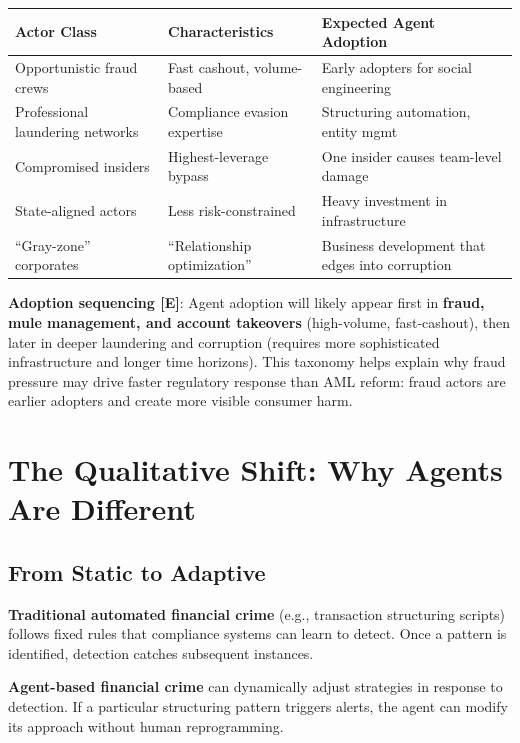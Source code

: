\documentclass[11pt,letterpaper]{article}
\begin{document}
\begingroup\small
\begin{longtable}{L{0.280\dimexpr{}\tabcolsep\relax}L{0.320\dimexpr{}\tabcolsep\relax}L{0.400\dimexpr{}\tabcolsep\relax}}
\toprule
\textbf{Actor Class} & \textbf{Characteristics} & \textbf{Expected Agent Adoption} \\
\midrule
\endhead
Opportunistic fraud crews & Fast cashout, volume-based & Early adopters for social engineering \\
Professional laundering networks & Compliance evasion expertise & Structuring automation, entity mgmt \\
Compromised insiders & Highest-leverage bypass & One insider causes team-level damage \\
State-aligned actors & Less risk-constrained & Heavy investment in infrastructure \\
``Gray-zone'' corporates & ``Relationship optimization'' & Business development that edges into corruption \\
\bottomrule
\end{longtable}
\endgroup

\textbf{Adoption sequencing [E]}: Agent adoption will likely appear first in \textbf{fraud, mule management, and account takeovers} (high-volume, fast-cashout), then later in deeper laundering and corruption (requires more sophisticated infrastructure and longer time horizons). This taxonomy helps explain why fraud pressure may drive faster regulatory response than AML reform: fraud actors are earlier adopters and create more visible consumer harm.

\section{The Qualitative Shift: Why Agents Are Different}

\subsection{From Static to Adaptive}

\textbf{Traditional automated financial crime} (e.g., transaction structuring scripts) follows fixed rules that compliance systems can learn to detect. Once a pattern is identified, detection catches subsequent instances.

\textbf{Agent-based financial crime} can dynamically adjust strategies in response to detection. If a particular structuring pattern triggers alerts, the agent can modify its approach without human reprogramming.
\end{document}
